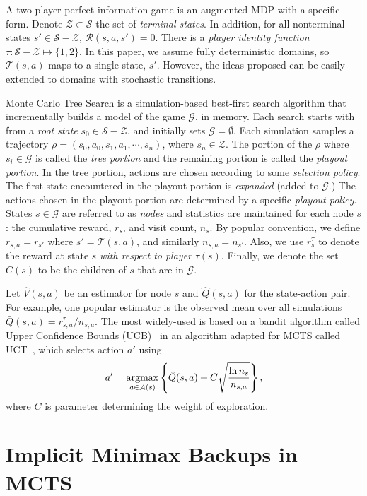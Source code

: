 \documentclass{article}
\newcommand{\argmax}{\operatornamewithlimits{argmax}}
\newcommand{\bQ}{\bar{Q}}
\newcommand{\cA}{\mathcal{A}}
\newcommand{\cG}{\mathcal{G}}
\newcommand{\cR}{\mathcal{R}}
\newcommand{\cS}{\mathcal{S}}
\newcommand{\cT}{\mathcal{T}}
\newcommand{\cZ}{\mathcal{Z}}
\newcommand{\hQ}{\hat{Q}}
\newcommand{\hV}{\hat{V}}
\begin{document}
A two-player perfect information game is an augmented MDP with a specific form. 
Denote $\cZ \subset \cS$ the set of {\it terminal states}. 
In addition, for all nonterminal states $s' \in \cS - \cZ$, $\cR(s,a,s') = 0$. 
There is a {\it player identity function} $\tau : \cS - \cZ \mapsto \{1,2\}$. 
In this paper, we assume fully deterministic domains, so $\cT(s,a)$ maps to a single state, $s'$. However, the ideas proposed can 
be easily extended to domains with stochastic transitions. 

Monte Carlo Tree Search is a simulation-based best-first search algorithm that incrementally builds a model of the game 
$\cG$, in memory. Each search starts with from a {\it root state} $s_0 \in \cS - \cZ$, and initially sets $\cG = \emptyset$. 
Each simulation samples a trajectory $\rho = (s_0, a_0, s_1, a_1, \cdots, s_n)$, where $s_n \in \cZ$. 
The portion of the $\rho$ where $s_i \in \cG$ is called the {\it tree portion} and the remaining portion is
called the {\it playout portion}. In the tree portion, actions are chosen according to some {\it selection policy}. 
The first state encountered in the playout portion is {\it expanded} (added to $\cG$.) 
The actions chosen in the playout portion are determined by a specific {\it playout policy}. 
States $s \in \cG$ are referred to as {\it nodes} and statistics are  
maintained for each node $s$: the cumulative reward, $r_s$, and visit count, $n_s$. 
By popular convention, we define $r_{s,a} = r_{s'}$ where $s' = \cT(s,a)$, and similarly $n_{s,a} = n_{s'}$. 
Also, we use $r^{\tau}_s$ to denote the reward at state $s$ {\it with respect to player} $\tau(s)$. 
Finally, we denote  the set $C(s)$ to be the children of $s$ that are in $\cG$. 

Let $\hV(s,a)$ be an estimator for node $s$ and $\hQ(s,a)$ for the state-action pair. 
For example, one popular estimator is the observed mean over all simulations 
$\bQ(s,a) = r^{\tau}_{s,a} / n_{s,a}$. 
The most widely-used is based on a bandit algorithm called Upper Confidence Bounds (UCB)~\cite{Auer02Finite} in an algorithm adapted 
for MCTS called UCT~\cite{Kocsis06Bandit}, which selects action $a'$ using
\begin{equation}
\label{eq:select-ucb}
a' = \argmax_{a \in \cA(s)} \left\{ \hQ(s,a) + C \sqrt{\frac{\ln n_s}{n_{s,a}}} \right\}, 
\end{equation}
where $C$ is parameter determining the weight of exploration. 

\section{Implicit Minimax Backups in MCTS}
\end{document}
